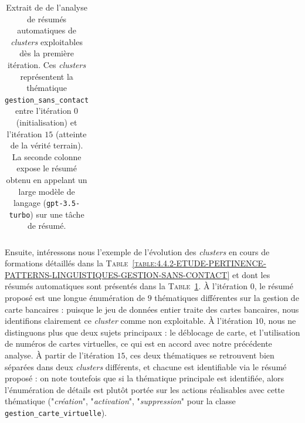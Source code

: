 \begin{table}[!htb]
\begin{center}
\begin{tabular}{|c|c|}
				\end{tabular}
				\end{center}
				\caption{
					Extrait de de l'analyse de résumés automatiques de \textit{clusters} exploitables dès la première itération.
					Ces \textit{clusters} représentent la thématique \texttt{gestion\_sans\_contact} entre l'itération $0$ (initialisation) et l'itération $15$ (atteinte de la vérité terrain).
					La seconde colonne expose le résumé obtenu en appelant un large modèle de langage (\texttt{gpt-3.5-turbo}) sur une tâche de résumé.
				}
				\label{table:4.4.3-ETUDE-PERTINENCE-RESUME-AUTOMATIQUE-GESTION-SANS-CONTACT}
			\end{table}
			
			Ensuite, intéressons nous l'exemple de l'évolution des \textit{clusters} en cours de formations détaillés dans la \textsc{Table~\ref{table:4.4.2-ETUDE-PERTINENCE-PATTERNS-LINGUISTIQUES-GESTION-SANS-CONTACT}} et dont les résumés automatiques sont présentés dans la \textsc{Table~\ref{table:4.4.3-ETUDE-PERTINENCE-RESUME-AUTOMATIQUE-GESTION-SANS-CONTACT}}.
			À l'itération $0$, le résumé proposé est une longue énumération de $9$ thématiques différentes sur la gestion de carte bancaires : puisque le jeu de données entier traite des cartes bancaires, nous identifions clairement ce \textit{cluster} comme non exploitable.
			À l'itération $10$, nous ne distinguons plus que deux sujets principaux : le déblocage de carte, et l'utilisation de numéros de cartes virtuelles, ce qui est en accord avec notre précédente analyse.
			À partir de l'itération $15$, ces deux thématiques se retrouvent bien séparées dans deux \textit{clusters} différents, et chacune est identifiable via le résumé proposé : on note toutefois que si la thématique principale est identifiée, alors l'énumération de détails est plutôt portée sur les actions réalisables avec cette thématique ("\textit{création}", "\textit{activation}", "\textit{suppression}" pour la classe \texttt{gestion\_carte\_virtuelle}).
